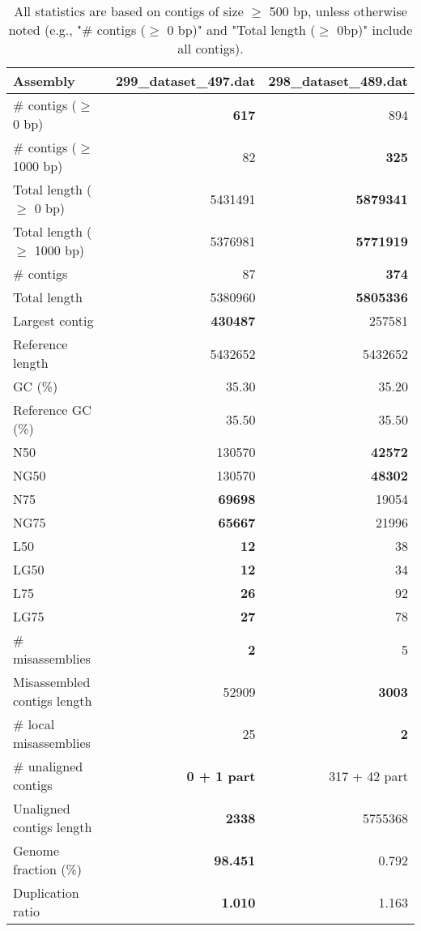 \documentclass[12pt,a4paper]{article}
\begin{document}
\begin{table}[ht]
\begin{center}
\caption{All statistics are based on contigs of size $\geq$ 500 bp, unless otherwise noted (e.g., "\# contigs ($\geq$ 0 bp)" and "Total length ($\geq$ 0bp)" include all contigs).}
\begin{tabular}{|l*{2}{|r}|}
\hline
Assembly & 299\_dataset\_497.dat & 298\_dataset\_489.dat \\ \hline
\# contigs ($\geq$ 0 bp) & {\bf 617} & 894 \\ \hline
\# contigs ($\geq$ 1000 bp) & 82 & {\bf 325} \\ \hline
Total length ($\geq$ 0 bp) & 5431491 & {\bf 5879341} \\ \hline
Total length ($\geq$ 1000 bp) & 5376981 & {\bf 5771919} \\ \hline
\# contigs & 87 & {\bf 374} \\ \hline
Total length & 5380960 & {\bf 5805336} \\ \hline
Largest contig & {\bf 430487} & 257581 \\ \hline
Reference length & 5432652 & 5432652 \\ \hline
GC (\%) & 35.30 & 35.20 \\ \hline
Reference GC (\%) & 35.50 & 35.50 \\ \hline
N50 & 130570 & {\bf 42572} \\ \hline
NG50 & 130570 & {\bf 48302} \\ \hline
N75 & {\bf 69698} & 19054 \\ \hline
NG75 & {\bf 65667} & 21996 \\ \hline
L50 & {\bf 12} & 38 \\ \hline
LG50 & {\bf 12} & 34 \\ \hline
L75 & {\bf 26} & 92 \\ \hline
LG75 & {\bf 27} & 78 \\ \hline
\# misassemblies & {\bf 2} & 5 \\ \hline
Misassembled contigs length & 52909 & {\bf 3003} \\ \hline
\# local misassemblies & 25 & {\bf 2} \\ \hline
\# unaligned contigs & {\bf 0 + 1 part} & 317 + 42 part \\ \hline
Unaligned contigs length & {\bf 2338} & 5755368 \\ \hline
Genome fraction (\%) & {\bf 98.451} & 0.792 \\ \hline
Duplication ratio & {\bf 1.010} & 1.163 \\ \hline

\end{tabular}
\end{center}
\end{table}
\end{document}
